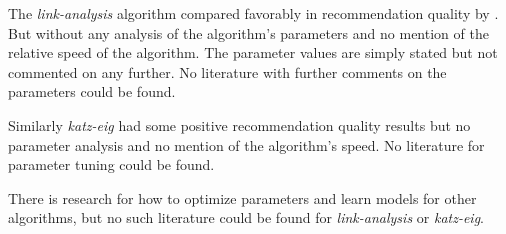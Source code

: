 The \textit{link-analysis} algorithm compared favorably in recommendation quality by \citep{huang2007comparison}. But without any analysis of the algorithm's parameters and no mention of the relative speed of the algorithm. The parameter values are simply stated but not commented on any further. No literature with further comments on the parameters could be found.

Similarly \textit{katz-eig} had some positive recommendation quality results \citep{shin2012multi} but no parameter analysis and no mention of the algorithm's speed. No literature for parameter tuning could be found.

There is research for how to optimize parameters and learn models for other algorithms, but no such literature could be found for \textit{link-analysis} or \textit{katz-eig}.




